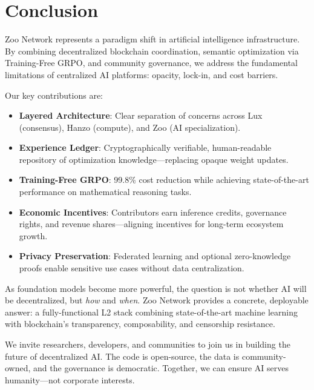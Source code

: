 \section{Conclusion}


Zoo Network represents a paradigm shift in artificial intelligence infrastructure. By combining decentralized blockchain coordination, semantic optimization via Training-Free GRPO, and community governance, we address the fundamental limitations of centralized AI platforms: opacity, lock-in, and cost barriers.

Our key contributions are:
\begin{itemize}
\item \textbf{Layered Architecture}: Clear separation of concerns across Lux (consensus), Hanzo (compute), and Zoo (AI specialization).
\item \textbf{Experience Ledger}: Cryptographically verifiable, human-readable repository of optimization knowledge—replacing opaque weight updates.
\item \textbf{Training-Free GRPO}: 99.8\% cost reduction while achieving state-of-the-art performance on mathematical reasoning tasks.
\item \textbf{Economic Incentives}: Contributors earn inference credits, governance rights, and revenue shares—aligning incentives for long-term ecosystem growth.
\item \textbf{Privacy Preservation}: Federated learning and optional zero-knowledge proofs enable sensitive use cases without data centralization.
\end{itemize}

As foundation models become more powerful, the question is not whether AI will be decentralized, but \textit{how} and \textit{when}. Zoo Network provides a concrete, deployable answer: a fully-functional L2 stack combining state-of-the-art machine learning with blockchain's transparency, composability, and censorship resistance.

We invite researchers, developers, and communities to join us in building the future of decentralized AI. The code is open-source, the data is community-owned, and the governance is democratic. Together, we can ensure AI serves humanity—not corporate interests.

